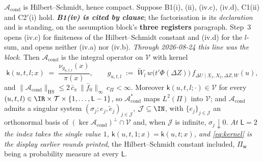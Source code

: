 \begin{proposition}[Compactness]\label{prp:compact}
$\mathcal A_{\mathrm{cond}}$ is Hilbert--Schmidt, hence compact.
Suppose B1(i), (ii), (iv.c), (iv.d), C1(ii) and C2$'$(i) hold. \emph{\textbf{B1(iv) is cited by
clause}}; the factorisation is its \emph{declaration} and is standing, on the assumption block's
\textbf{three registers} paragraph. Step~3 opens \textup{(iv.c)} for finiteness of the
Hilbert--Schmidt constant and \textup{(iv.d)} for the $l$-sum, and opens neither \textup{(iv.a)} nor
\textup{(iv.b)}. \emph{Through 2026-08-24 this line was the block}. Then $\mathcal A_{\mathrm{cond}}$ is the integral
operator on $\mathcal V$ with kernel
\begin{equation}\label{eq:kernel}
\mathsf k(u,t,l;x)\;=\;\frac{\nu_{g_{u,t,l}}(x)}{\pi(x)},
\qquad
g_{u,t,l}\;:=\;\widetilde W_l\,w\big(t'\Phi(\Delta Z)\big)\,f_{\Delta U\mid X_1,X_2,\Delta Z,W}(u),
\end{equation}
and $\|\mathcal A_{\mathrm{cond}}\|_{\mathrm{HS}}\le 2\,\bar c_\pi\,\|\bar f_0\|_\infty\,c_\Pi<\infty$.
Moreover $\mathsf k(u,t,l;\cdot)\in\mathcal V$ for every
$(u,t,l)\in\IR\times\mathcal T\times\{1,\dots,\mathsf L-1\}$, so $\mathcal A^\ast_{\mathrm{cond}}$ maps
$L^{2}(\Pi)$ into $\mathcal V$; and $\mathcal A_{\mathrm{cond}}$ admits a singular system
$(\sigma_j;e_j,\tilde e_j)_{j\in\mathcal J}$, $\mathcal J\subseteq\IN$, with $\{e_j\}_{j\in\mathcal J}$
an orthonormal basis of $(\ker\mathcal A_{\mathrm{cond}})^{\perp}\cap\mathcal V$ and, when $\mathcal J$ is
infinite, $\sigma_j\downarrow0$.
\emph{At $\mathsf L=2$ the index takes the single value $1$, $\mathsf k(u,t,1;x)=\mathsf k(u,t;x)$, and
\eqref{eq:kernel} is the display earlier rounds printed}, the Hilbert--Schmidt constant included,
$\Pi_{\mathsf w}$ being a probability measure at every $\mathsf L$.
\end{proposition}

